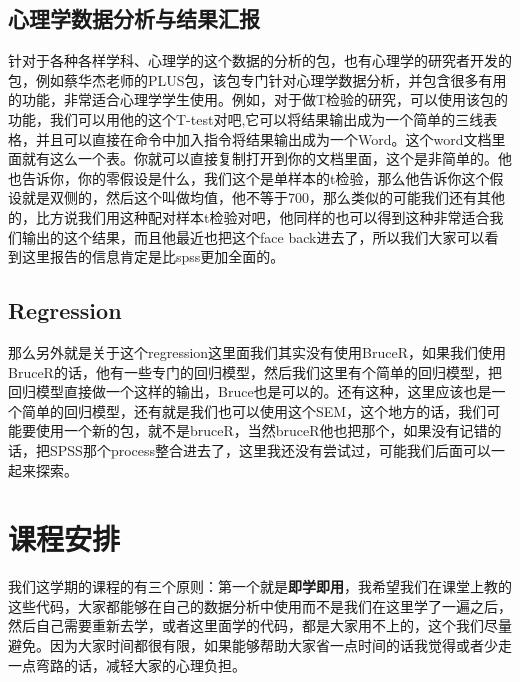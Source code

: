 \documentclass[
  oneside]{book}
\begin{document}
\hypertarget{ux5fc3ux7406ux5b66ux6570ux636eux5206ux6790ux4e0eux7ed3ux679cux6c47ux62a5}{%
\subsection{心理学数据分析与结果汇报}\label{ux5fc3ux7406ux5b66ux6570ux636eux5206ux6790ux4e0eux7ed3ux679cux6c47ux62a5}}

针对于各种各样学科、心理学的这个数据的分析的包，也有心理学的研究者开发的包，例如蔡华杰老师的PLUS包，该包专门针对心理学数据分析，并包含很多有用的功能，非常适合心理学学生使用。例如，对于做T检验的研究，可以使用该包的功能，我们可以用他的这个T-test对吧,它可以将结果输出成为一个简单的三线表格，并且可以直接在命令中加入指令将结果输出成为一个Word。这个word文档里面就有这么一个表。你就可以直接复制打开到你的文档里面，这个是非简单的。他也告诉你，你的零假设是什么，我们这个是单样本的t检验，那么他告诉你这个假设就是双侧的，然后这个叫做均值，他不等于700，那么类似的可能我们还有其他的，比方说我们用这种配对样本t检验对吧，他同样的也可以得到这种非常适合我们输出的这个结果，而且他最近也把这个face
back进去了，所以我们大家可以看到这里报告的信息肯定是比spss更加全面的。

\hypertarget{regression}{%
\subsection{Regression}\label{regression}}

那么另外就是关于这个regression这里面我们其实没有使用BruceR，如果我们使用BruceR的话，他有一些专门的回归模型，然后我们这里有个简单的回归模型，把回归模型直接做一个这样的输出，Bruce也是可以的。还有这种，这里应该也是一个简单的回归模型，还有就是我们也可以使用这个SEM，这个地方的话，我们可能要使用一个新的包，就不是bruceR，当然bruceR他也把那个，如果没有记错的话，把SPSS那个process整合进去了，这里我还没有尝试过，可能我们后面可以一起来探索。

\hypertarget{ux8bfeux7a0bux5b89ux6392}{%
\section{课程安排}\label{ux8bfeux7a0bux5b89ux6392}}

我们这学期的课程的有三个原则：第一个就是\textbf{即学即用}，我希望我们在课堂上教的这些代码，大家都能够在自己的数据分析中使用而不是我们在这里学了一遍之后，然后自己需要重新去学，或者这里面学的代码，都是大家用不上的，这个我们尽量避免。因为大家时间都很有限，如果能够帮助大家省一点时间的话我觉得或者少走一点弯路的话，减轻大家的心理负担。
\end{document}
